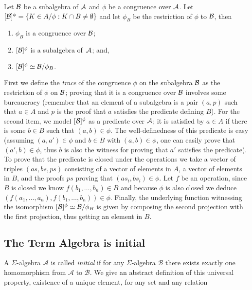 \begin{theorem} Let $\mathcal{B}$ be a
subalgebra of $\mathcal{A}$ and $\phi$ be a congruence over $\mathcal{A}$. Let
$[\mathcal{B}]^{\phi}=\{K \in A / \phi : K \cap B \not= \emptyset\}$ and
let $\phi_B$ be the restriction of $\phi$ to $\mathcal{B}$, then
\begin{enumerate}
\item$\phi_B$ is a congruence over $\mathcal{B}$;
\item$[\mathcal{B}]^{\phi}$ is a subalgebra of~$\mathcal{A}$; and,
\item$[\mathcal{B}]^{\phi} \simeq \mathcal{B} / \phi_B$.
\end{enumerate}
\end{theorem}
\noindent First we define the \emph{trace} of the congruence $\phi$ on
the subalgebra $\mathcal{B}$ as the restriction of $\phi$ on $\mathcal{B}$;
proving that it is a congruence over $\mathcal{B}$ involves some
bureaucracy (remember that an element of a subalgebra is a pair
$(a, p)$ such that $a \in A$ and $p$ is the proof that $a$ satisfies
the predicate defining $B$). For the second item, we model
$[\mathcal{B}]^{\phi}$ as a predicate over $\mathcal{A}$; it is satisfied by
$a \in A$ if there is some $b \in B$ such that $(a,b) \in \phi$. The
well-definedness of this predicate is easy (assuming $(a,a') \in \phi$
and $b\in B$ with $(a,b) \in \phi$, one can easily prove that
$(a',b) \in \phi$, thus $b$ is also the witness for proving that $a'$
satisfies the predicate). To prove that the predicate is closed under
the operations we take a vector of triples $(as,bs,ps)$ consisting of
a vector of elements in $A$, a vector of elements in $B$, and the
proofs $ps$ proving that $(as_i,bs_i)\in\phi$. Let $f$ be an
operation, since $B$ is closed we know $f(b_1,\ldots,b_n)\in B$ and
because $\phi$ is also closed we deduce
$(f(a_1,\ldots,a_n),f(b_1,\ldots,b_n))\in\phi$. Finally, the
underlying function witnessing the isomorphism
$[\mathcal{B}]^{\phi} \simeq \mathcal{B} / \phi_B$ is given by composing the
second projection with the first projection, thus getting an element
in $B$.

\subsection{The Term Algebra is initial}

A $\Sigma$-algebra $\mathcal{A}$ is called \emph{initial} if for any
$\Sigma$-algebra $\mathcal{B}$ there exists exactly one homomorphism
from $\mathcal{A}$ to $\mathcal{B}$. We give an abstract definition of
this universal property, existence of a unique element, for any set
 and any relation 

